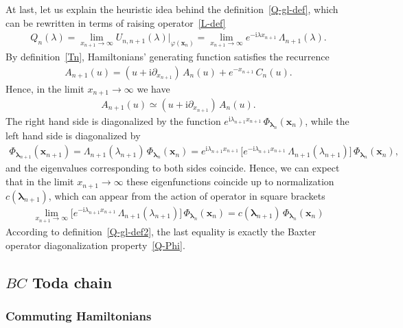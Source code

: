 \documentclass[11pt]{article}
\numberwithin{equation}{section}
\theoremstyle{plain}
\theoremstyle{definition}
\renewcommand{\phi}{\varphi}
\renewcommand{\imath}{\mathrm{i}}
\begin{document}
At last, let us explain the heuristic idea behind the definition~\eqref{Q-gl-def}, which can be rewritten in terms of raising operator~\eqref{L-def}
\begin{align} \label{Q-gl-def2}
	Q_n(\lambda)  = \lim_{x_{n + 1} \to \infty} U_{n, n + 1}(\lambda) \bigr|_{\phi(\bm{x}_n)} = \lim_{x_{n + 1} \to \infty} e^{-\imath \lambda x_{n + 1}} \, \Lambda_{n + 1}(\lambda).
\end{align}
By definition~\eqref{Tn}, Hamiltonians' generating function satisfies the recurrence
\begin{align}
	A_{n + 1}(u) = (u + \imath \partial_{x_{n + 1}} ) \, A_n(u) + e^{-x_{n + 1}} \, C_{n }(u).
\end{align}
Hence, in the limit $x_{n + 1} \to \infty$ we have
\begin{align}
	A_{n + 1}(u) \simeq (u + \imath \partial_{x_{n + 1}} ) \, A_n(u).
\end{align}
The right hand side is diagonalized by the function $e^{\imath \lambda_{n + 1} x_{n + 1}} \, \Phi_{\bm{\lambda}_n}(\bm{x}_n)$, while the left hand side is diagonalized by 
\begin{align}
	\Phi_{\bm{\lambda}_{n + 1}}(\bm{x}_{n + 1}) = \Lambda_{n + 1}(\lambda_{n + 1})\, \Phi_{\bm{\lambda}_n}(\bm{x}_n) = e^{\imath \lambda_{n + 1} x_{n + 1}} \, \bigl[ e^{-\imath \lambda_{n + 1} x_{n + 1}} \, \Lambda_{n + 1}(\lambda_{n + 1})\bigr] \, \Phi_{\bm{\lambda}_n}(\bm{x}_n),
\end{align}
and the eigenvalues corresponding to both sides coincide. Hence, we can expect that in the limit $x_{n + 1} \to \infty$ these eigenfunctions coincide up to normalization $c(\bm{\lambda}_{n + 1})$, which can appear from the action of operator in square brackets
\begin{align}
	\lim_{x_{n + 1} \to \infty} \bigl[ e^{-\imath \lambda_{n + 1} x_{n + 1}} \, \Lambda_{n + 1}(\lambda_{n + 1})\bigr] \, \Phi_{\bm{\lambda}_n}(\bm{x}_n) = c(\bm{\lambda}_{n + 1}) \, \Phi_{\bm{\lambda}_n}(\bm{x}_n)
\end{align}
According to definition~\eqref{Q-gl-def2}, the last equality is exactly the Baxter operator diagonalization property~\eqref{Q-Phi}.

\subsection{$BC$ Toda chain}

\subsubsection{Commuting Hamiltonians} \label{sec:bc-ham}
\end{document}
